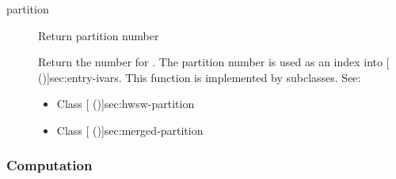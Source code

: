 \begin{description}

\item[partition] \texonly{---} Return partition number\\

Return the  number for
.  The partition number is used as an index into
[ (\Sec\Ref)]{sec:entry-ivars}. This
function is implemented by subclasses.  See:
\begin{itemize}
\item Class [ (\Sec\Ref)]{sec:hwsw-partition}
\item Class [ (\Sec\Ref)]{sec:merged-partition}
\end{itemize}
\end{description}

\subsubsection{Computation}

